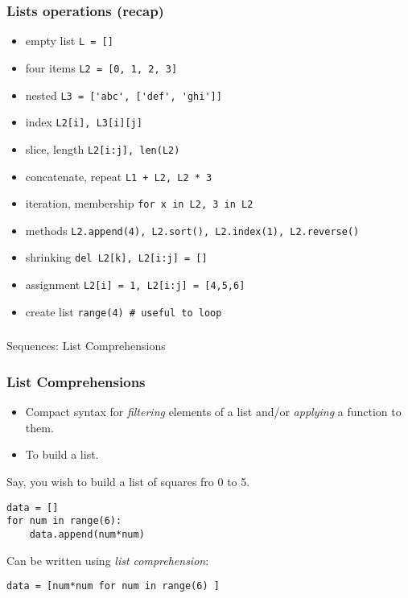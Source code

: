 \begin{frame}[fragile]\frametitle{Lists operations (recap)}
  \begin{itemize}
  \item empty list \lstinline{L = []}
  \item four items \lstinline{L2 = [0, 1, 2, 3]}
  \item nested \lstinline{L3 = ['abc', ['def', 'ghi']]}
  \item index \lstinline{L2[i], L3[i][j]}
  \item slice, length \lstinline{L2[i:j], len(L2)}
  \item concatenate, repeat \lstinline{L1 + L2, L2 * 3}
  \item iteration, membership \lstinline{for x in L2, 3 in L2}
  \item methods \lstinline{L2.append(4), L2.sort(), L2.index(1), L2.reverse()}
  \item shrinking \lstinline{del L2[k], L2[i:j] = []}
  \item assignment \lstinline{L2[i] = 1, L2[i:j] = [4,5,6]}
  \item create list \lstinline{range(4) # useful to loop}
  \end{itemize}
\end{frame}

\begin{frame}[fragile]\frametitle{}
\begin{center}
{\Large Sequences: List Comprehensions}
\end{center}
\end{frame}

\begin{frame}[fragile]\frametitle{List Comprehensions}
  \begin{itemize}
  \item Compact syntax for \emph{filtering} elements  of a list and/or \emph{applying} a function to them.
\item To build a list.
\end{itemize}
Say, you wish to build a list of squares fro 0 to 5.
  \begin{lstlisting}
data = []
for num in range(6):
    data.append(num*num)
  \end{lstlisting}
  
 Can be written using \textit{list comprehension}:
  \begin{lstlisting}
data = [num*num for num in range(6) ]
  \end{lstlisting}

\end{frame}

